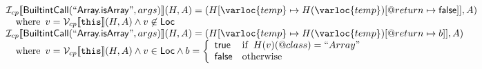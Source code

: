 \[\begin{array}{l}
\\\\


\I _{cp}\lbr \SF{BuiltintCall}(``\SF{Array.isArray}",args)\rbr(H,A)
 = (H[\varloc{temp}\mapsto H(\varloc{temp})[\varprop{return}\mapsto \SF{false}]], A) \\
\quad\wherec{
  v = \V _{cp}\lbr \TT{this}\rbr (H,A) \land v \not\in \SF{Loc} 
  }\\

\I _{cp}\lbr \SF{BuiltintCall}(``\SF{Array.isArray}",args)\rbr(H,A)
 = (H[\varloc{temp}\mapsto H(\varloc{temp})[\varprop{return}\mapsto b]], A) \\
\quad\wherec{
  v = \V _{cp}\lbr \TT{this}\rbr (H,A) \land v \in \SF{Loc}
  \land b = \left\{\begin{array}{ll}
      \SF{true} & \ifc{H(v)(@class) = ``Array"}\\
      \SF{false} & \owc
    \end{array}\right.
  }\\
\end{array}
\]


